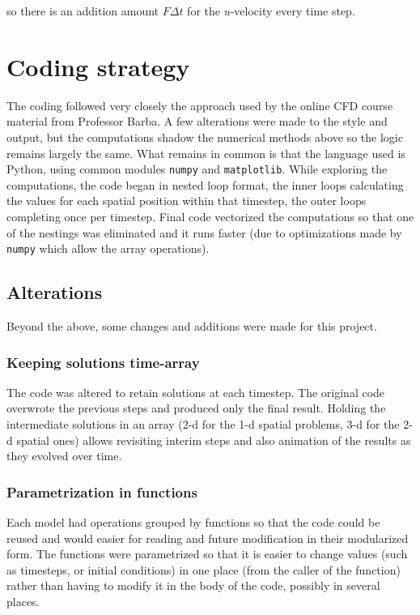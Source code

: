 \documentclass[11pt]{article}
\begin{document}
{so there is an addition amount $F\Delta t$ for the $u$-velocity every time step.

\section{Coding strategy}

The coding followed very closely the approach used by the online CFD course material
from Professor Barba. A few alterations were made to the style and output, but the
computations shadow the numerical methods above so the logic remains largely the same.
What remains in common is that the language used is Python, using common modules
\texttt{numpy} and \texttt{matplotlib}. While exploring the computations, the code
began in nested loop format, the inner loops calculating the values for each spatial
position within that timestep, the outer loops completing once per timestep. Final
code vectorized the computations so that one of the nestings was eliminated and it
runs faster (due to optimizations made by \texttt{numpy} which allow the array operations).

\subsection{Alterations}
Beyond the above, some changes and additions were made for this project.

\subsubsection{Keeping solutions time-array}
The code was altered to retain solutions at each timestep. The original
code overwrote the previous steps and produced only the final result. Holding the
intermediate solutions in an array (2-d for the 1-d spatial problems, 3-d for the
2-d spatial ones) allows revisiting interim steps and also animation of the results
as they evolved over time.

\subsubsection{Parametrization in functions}
Each model had operations grouped by functions so that the code could be reused and
would easier for reading and future modification in their modularized form. The functions
were parametrized so that it is easier to change values (such as timesteps, or initial
conditions) in one place (from the caller of the function) rather than having to modify it in
the body of the code, possibly in several places.

}
\end{document}

